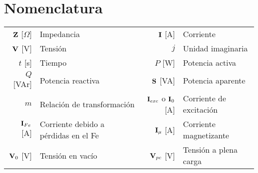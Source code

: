\documentclass[11pt,a4paper]{article}
\begin{document}
	\pagestyle{pieyencabezado}
	\section*{Nomenclatura}
	
	\begin{tabular}{r l r l}
		$\fasor{Z}$ [$\Omega$]& Impedancia &
		$\fasor{i}$ [A] & Corriente \\
		$\fasor{v}$ [V] & Tensión&
		$j$ & Unidad imaginaria \\
		$t$ [s] & Tiempo &
		$P$ [W] & Potencia activa \\
		$Q$ [VAr] & Potencia reactiva &
		$\fasor{s}$ [VA] & Potencia aparente \\
		$m$ & Relación de transformación&
		$\fasor{I}_{exc}$ o $\fasor{I}_0$ [A] & Corriente de excitación\\
		$\fasor{I}_{Fe}$ [A] & Corriente debido a pérdidas en el Fe&
		$\fasor{I}_{\mu}$ [A] & Corriente magnetizante\\
		$\fasor{v}_0$ [V] & Tensión en vacío & $\fasor{v}_{pc}$ [V] & Tensión a plena carga \\
	\end{tabular}
	
\end{document}
